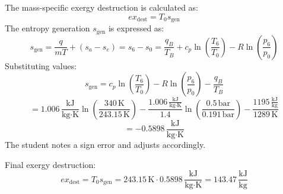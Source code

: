 The mass-specific exergy destruction is calculated as:  
\[
ex_{\text{dest}} = T_0 s_{\text{gen}}
\]  
The entropy generation \( s_{\text{gen}} \) is expressed as:  
\[
s_{\text{gen}} = \frac{q}{mT} + (s_a - s_e) = s_6 - s_0 = \frac{q_B}{T_B} + c_p \ln \left(\frac{T_6}{T_0}\right) - R \ln \left(\frac{p_6}{p_0}\right)
\]  
Substituting values:  
\[
s_{\text{gen}} = c_p \ln \left(\frac{T_6}{T_0}\right) - R \ln \left(\frac{p_6}{p_0}\right) - \frac{q_B}{T_B}
\]  
\[
= 1.006 \, \frac{\text{kJ}}{\text{kg·K}} \ln \left(\frac{340 \, \text{K}}{243.15 \, \text{K}}\right) - \frac{1.006 \, \frac{\text{kJ}}{\text{kg·K}}}{1.4} \ln \left(\frac{0.5 \, \text{bar}}{0.191 \, \text{bar}}\right) - \frac{1195 \, \frac{\text{kJ}}{\text{kg}}}{1289 \, \text{K}}
\]  
\[
= -0.5898 \, \frac{\text{kJ}}{\text{kg·K}}
\]  
The student notes a sign error and adjusts accordingly.  

Final exergy destruction:  
\[
ex_{\text{dest}} = T_0 s_{\text{gen}} = 243.15 \, \text{K} \cdot 0.5898 \, \frac{\text{kJ}}{\text{kg·K}} = 143.47 \, \frac{\text{kJ}}{\text{kg}}
\]
